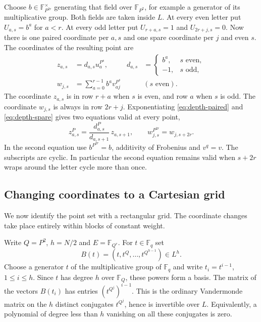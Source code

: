 \documentclass[11pt,letterpaper]{article}
\begin{document}
Choose $b\in \mathbb F_{P^{2r}}^\times$ generating that field over $\mathbb F_{P^2}$, for example a generator of its multiplicative group. Both fields are taken inside $L$. At every even letter put $U_{a,s}=b^a$ for $a<r$. At every odd letter put $U_{r+a,s}=1$ and $U_{2r+j,s}=0$. Now there is one paired coordinate per $a,s$ and one spare coordinate per $j$ and even $s$. The coordinates of the resulting point are
\begin{align}
 z_{a,s}&=d_{a,s}u_a^{P^s},
 &d_{a,s}&=\begin{cases}b^a,&s\text{ even},\\-1,&s\text{ odd},\end{cases}
 \label{eq:depth-paired}\\
 w_{j,s}&=\sum_{a=0}^{r-1} b^a v_{aj}^{P^s}
 &&(s\text{ even}).
 \label{eq:depth-spare}
\end{align}
The coordinate $z_{a,s}$ is in row $r+a$ when $s$ is even, and row $a$ when $s$ is odd. The coordinate $w_{j,s}$ is always in row $2r+j$. Exponentiating \eqref{eq:depth-paired} and \eqref{eq:depth-spare} gives two equations valid at every point,
\begin{equation}
 z_{a,s}^P=\frac{d_{a,s}^P}{d_{a,s+1}}\,z_{a,s+1},
 \qquad
 w_{j,s}^{P^{2r}}=w_{j,s+2r}.
 \label{eq:depth-relations}
\end{equation}
In the second equation use $b^{P^{2r}}=b$, additivity of Frobenius and $v^q=v$. The subscripts are cyclic. In particular the second equation remains valid when $s+2r$ wraps around the letter cycle more than once.

\subsection{Changing coordinates to a Cartesian grid}
\label{sec:depth-grid}

We now identify the point set with a rectangular grid. The coordinate changes take place entirely within blocks of constant weight.

Write $Q=P^2$, $h=N/2$ and $E=\mathbb F_{Q^r}$. For $t\in\mathbb F_q$ set
\[
 B(t)=(t,t^Q,\ldots,t^{Q^{h-1}})\in L^h.
\]
Choose a generator $t$ of the multiplicative group of $\mathbb F_q$ and write $t_i=t^{i-1}$, $1\leq i\leq h$. Since $t$ has degree $h$ over $\mathbb F_Q$, these powers form a basis. The matrix of the vectors $B(t_i)$ has entries $(t^{Q^j})^{i-1}$. This is the ordinary Vandermonde matrix on the $h$ distinct conjugates $t^{Q^j}$, hence is invertible over $L$. Equivalently, a polynomial of degree less than $h$ vanishing on all these conjugates is zero.
\end{document}
